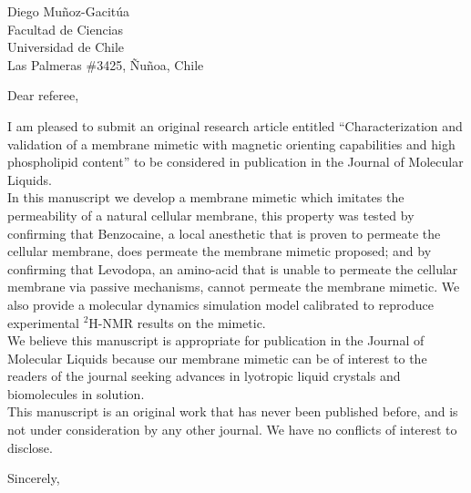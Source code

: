\documentclass{letter}
\begin{document}
\begin{letter}{Diego Muñoz-Gacitúa\\ Facultad de Ciencias \\ Universidad de
    Chile \\ Las Palmeras \#3425, Ñuñoa, Chile}
  
\opening{Dear referee,}
I am pleased to submit an original research article entitled ``Characterization
and validation of a membrane mimetic with magnetic orienting capabilities and
high phospholipid content'' to be considered in publication in the Journal of
Molecular Liquids.\\

In this manuscript we develop a membrane mimetic which imitates the permeability
of a natural cellular membrane, this property was tested by confirming that
Benzocaine, a local anesthetic that is proven to permeate the cellular membrane,
does permeate the membrane mimetic proposed; and by confirming that Levodopa, an
amino-acid that is unable to permeate the cellular membrane via passive
mechanisms, cannot permeate the membrane mimetic. We also provide a molecular
dynamics simulation model calibrated to reproduce experimental $^2$H-NMR results
on the mimetic.\\

We believe this manuscript is appropriate for publication in the Journal of
Molecular Liquids because our membrane mimetic can be of interest to the
readers of the journal seeking advances in lyotropic liquid crystals and biomolecules in solution.\\

This manuscript is an original work that has never been published
before, and is not under consideration by any other journal. We have
no conflicts of interest to disclose. 

\closing{Sincerely,}

\end{letter}
\end{document}
